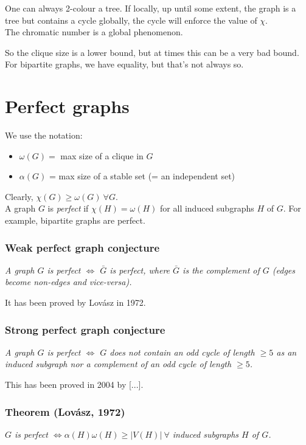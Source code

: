 		One can always 2-colour a tree. If locally, up until some extent, the graph is a tree but contains a cycle globally, the cycle will enforce the value of $\chi$.\\
		
		The chromatic number is a global phenomenon.
		
	So the clique size is a lower bound, but at times this can be a very bad bound. For bipartite graphs, we have equality, but that's not always so.
	
	\section{Perfect graphs}
		
		We use the notation:
		\begin{itemize}
			\item $\omega(G) = $ max size of a clique in $G$
			\item $\alpha(G)$ = max size of a stable set (= an independent set) 
		\end{itemize}
		
		Clearly, $\chi(G) \geq \omega(G) ~\forall G$.\\
		
		A graph $G$ is \textit{perfect} if $\chi(H) = \omega(H)$ for all induced subgraphs $H$ of $G$. For example, bipartite graphs are perfect.\\

	\subsubsection{Weak perfect graph conjecture}
	\textit{A graph $G$ is perfect $\iff$ $\bar{G}$ is perfect, where $\bar{G}$ is the complement of $G$ (edges become non-edges and vice-versa).\\}
	
	It has been proved by Lovász in 1972.
	
	\subsubsection{Strong perfect graph conjecture}
	\textit{A graph $G$ is perfect $\iff$ $G$ does not contain an odd cycle of length $\geq 5$ as an induced subgraph nor a complement of an odd cycle of length $\geq 5$.\\}
	
	This has been proved in 2004 by [...].
	
	\subsubsection{Theorem (Lovász, 1972)}
	\textit{$G$ is perfect $\iff \alpha(H) \omega(H) \geq |V(H)| ~ \forall$ induced subgraphs $H$ of $G$.\\}
	
